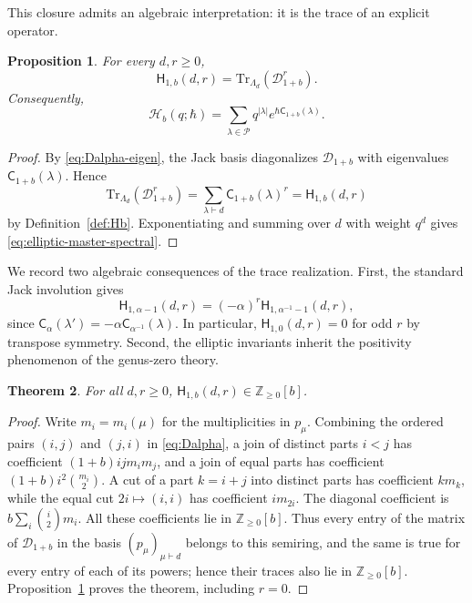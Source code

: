 \documentclass[11pt,a4paper,reqno]{article}
\newtheorem{theorem}{Theorem}[section]
\newtheorem{proposition}[theorem]{Proposition}
\theoremstyle{definition}
\theoremstyle{remark}
\newcommand\Z{{\mathbb Z}}
\newcommand\Tr{{\mathrm{Tr}}}
\newcommand\cA{{\mathsf C}}
\newcommand\Hb{{\mathsf H}}
\newcommand\Pcal{{\mathcal P}}
\newcommand\Dcal{{\mathcal D}}
\begin{document}
This closure admits an algebraic interpretation: it is the trace of an explicit operator.

\begin{proposition}\label{prop:cut-and-join-trace}
For every $d,r\geq0$,
\begin{equation}\label{eq:Hb-trace}
\Hb_{1,b}(d,r)=\Tr_{\Lambda_d}(\Dcal_{1+b}^{r}).
\end{equation}
Consequently,
\begin{equation}\label{eq:elliptic-master-spectral}
\mathscr H_b(q;\hbar)=\sum_{\lambda\in\Pcal}q^{|\lambda|}e^{\hbar\cA_{1+b}(\lambda)}.
\end{equation}
\end{proposition}

\begin{proof}
By \eqref{eq:Dalpha-eigen}, the Jack basis diagonalizes $\Dcal_{1+b}$ with eigenvalues $\cA_{1+b}(\lambda)$.  Hence
\[
\Tr_{\Lambda_d}(\Dcal_{1+b}^{r}) =\sum_{\lambda\vdash d}\cA_{1+b}(\lambda)^r =\Hb_{1,b}(d,r)
\]
by Definition~\ref{def:Hb}.  Exponentiating and summing over $d$ with weight $q^d$ gives \eqref{eq:elliptic-master-spectral}.
\end{proof}

We record two algebraic consequences of the trace realization. First, the standard Jack involution gives
\begin{equation}\label{eq:elliptic-Jack-duality}
\Hb_{1,\alpha-1}(d,r) =(-\alpha)^r\Hb_{1,\alpha^{-1}-1}(d,r),
\end{equation}
since $\cA_\alpha(\lambda')=-\alpha\cA_{\alpha^{-1}}(\lambda)$.  In particular, $\Hb_{1,0}(d,r)=0$ for odd $r$ by transpose symmetry. Second, the elliptic invariants inherit the positivity phenomenon of the genus-zero theory.

\begin{theorem}\label{thm:positivity}
For all $d,r\geq0$, $\Hb_{1,b}(d,r)\in\Z_{\geq0}[b]$.
\end{theorem}

\begin{proof}
Write $m_i=m_i(\mu)$ for the multiplicities in $p_\mu$.  Combining the ordered pairs $(i,j)$ and $(j,i)$ in \eqref{eq:Dalpha}, a join of distinct parts $i<j$ has coefficient $(1+b)ijm_im_j$, and a join of equal parts has coefficient $(1+b)i^2\binom{m_i}{2}$.  A cut of a part $k=i+j$ into distinct parts has coefficient $k m_k$, while the equal cut $2i\mapsto(i,i)$ has coefficient $i m_{2i}$.  The diagonal coefficient is $b\sum_i\binom{i}{2}m_i$.  All these coefficients lie in $\Z_{\geq0}[b]$.  Thus every entry of the matrix of $\Dcal_{1+b}$ in the basis $(p_\mu)_{\mu\vdash d}$ belongs to this semiring, and the same is true for every entry of each of its powers; hence their traces also lie in $\Z_{\geq0}[b]$.  Proposition~\ref{prop:cut-and-join-trace} proves the theorem, including $r=0$.
\end{proof}
\end{document}
